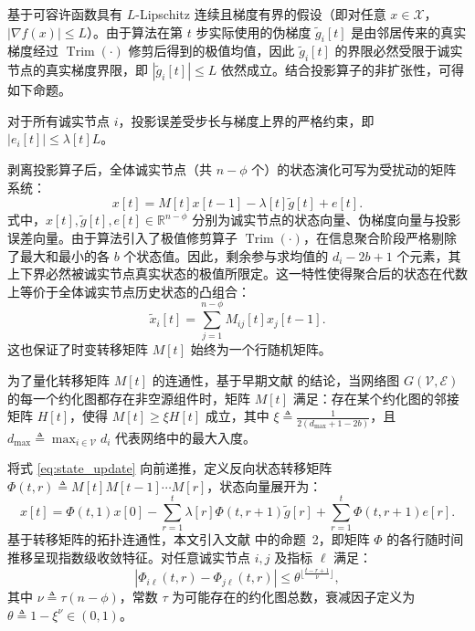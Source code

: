 基于可容许函数具有 $L$-Lipschitz 连续且梯度有界的假设（即对任意 $x \in \mathcal{X}$，$|\nabla f(x)| \le L$）。由于算法在第 $t$ 步实际使用的伪梯度 $\tilde{g}_i[t]$ 是由邻居传来的真实梯度经过 $\operatorname{Trim}(\cdot)$ 修剪后得到的极值均值，因此 $\tilde{g}_i[t]$ 的界限必然受限于诚实节点的真实梯度界限，即 $|\tilde{g}_i[t]| \le L$ 依然成立。结合投影算子的非扩张性，可得如下命题。

\begin{proposition}\label{prop:1}
    对于所有诚实节点 $i$，投影误差受步长与梯度上界的严格约束，即 $|e_i[t]| \le \lambda[t]L$。
\end{proposition}

剥离投影算子后，全体诚实节点（共 $n-\phi$ 个）的状态演化可写为受扰动的矩阵系统：
\begin{equation}
    \label{eq:state_update}
    x[t] = M[t]x[t-1] - \lambda[t]\tilde{g}[t] + e[t].
\end{equation}
式中，$x[t], \tilde{g}[t], e[t] \in \mathbb{R}^{n-\phi}$ 分别为诚实节点的状态向量、伪梯度向量与投影误差向量。由于算法引入了极值修剪算子 $\operatorname{Trim}(\cdot)$，在信息聚合阶段严格剔除了最大和最小的各 $b$ 个状态值。因此，剩余参与求均值的 $d_i - 2b + 1$ 个元素，其上下界必然被诚实节点真实状态的极值所限定。这一特性使得聚合后的状态在代数上等价于全体诚实节点历史状态的凸组合：
\begin{equation} \label{eq:convex_comb}
    \tilde{x}_i[t] = \sum_{j=1}^{n-\phi} M_{ij}[t]x_j[t-1].
\end{equation}
这也保证了时变转移矩阵 $M[t]$ 始终为一个行随机矩阵。

为了量化转移矩阵 $M[t]$ 的连通性，基于早期文献 \cite{vaidya2012iterative} 的结论，当网络图 $G(\mathcal{V}, \mathcal{E})$ 的每一个约化图都存在非空源组件时，矩阵 $M[t]$ 满足：存在某个约化图的邻接矩阵 $H[t]$，使得 $M[t] \ge \xi H[t]$ 成立，其中 $\xi \triangleq \frac{1}{2(d_{\max} + 1 - 2b)}$，且 $d_{\max} \triangleq \max_{i \in \mathcal{V}}d_i$ 代表网络中的最大入度。

将式 \eqref{eq:state_update} 向前递推，定义反向状态转移矩阵 $\Phi(t, r) \triangleq M[t]M[t-1] \cdots M[r]$，状态向量展开为：
\begin{equation} \label{eq:expansion}
    x[t] = \Phi(t, 1)x[0] - \sum_{r=1}^t \lambda[r]\Phi(t, r+1)\tilde{g}[r] + \sum_{r=1}^t \Phi(t, r+1)e[r].
\end{equation}
基于转移矩阵的拓扑连通性，本文引入文献 \cite{tseng2015fault} 中的命题~2，即矩阵 $\Phi$ 的各行随时间推移呈现指数级收敛特征。对任意诚实节点 $i, j$ 及指标 $\ell$ 满足：
\begin{equation}
    |\Phi_{i\ell}(t, r) - \Phi_{j\ell}(t, r)| \le \theta^{\lfloor \frac{t-r+1}{\nu} \rfloor},
\end{equation}
其中 $\nu \triangleq \tau(n-\phi)$，常数 $\tau$ 为可能存在的约化图总数，衰减因子定义为 $\theta \triangleq 1 - \xi^\nu \in (0, 1)$。

